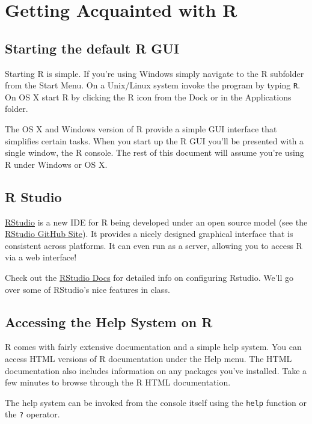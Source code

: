 \documentclass{article}
\begin{document}
\section{Getting Acquainted with R}

\subsection{Starting the default R GUI}

Starting R is simple. If you're using Windows simply navigate to the R
subfolder from the Start Menu. On a Unix/Linux system invoke the program
by typing \lstinline!R!. On OS X start R by clicking the R icon from the
Dock or in the Applications folder.

The OS X and Windows version of R provide a simple GUI interface that
simplifies certain tasks. When you start up the R GUI you'll be
presented with a single window, the R console. The rest of this document
will assume you're using R under Windows or OS X.

\subsection{R Studio}

\href{http://rstudio.org/}{RStudio} is a new IDE for R being developed
under an open source model (see the
\href{https://github.com/rstudio/rstudio}{RStudio GitHub Site}). It
provides a nicely designed graphical interface that is consistent across
platforms. It can even run as a server, allowing you to access R via a
web interface!

Check out the \href{http://rstudio.org/docs/}{RStudio Docs} for detailed
info on configuring Rstudio. We'll go over some of RStudio's nice
features in class.

\subsection{Accessing the Help System on R}

R comes with fairly extensive documentation and a simple help system.
You can access HTML versions of R documentation under the Help menu. The
HTML documentation also includes information on any packages you've
installed. Take a few minutes to browse through the R HTML
documentation.

The help system can be invoked from the console itself using the
\lstinline!help! function or the \lstinline!?! operator.
\end{document}
